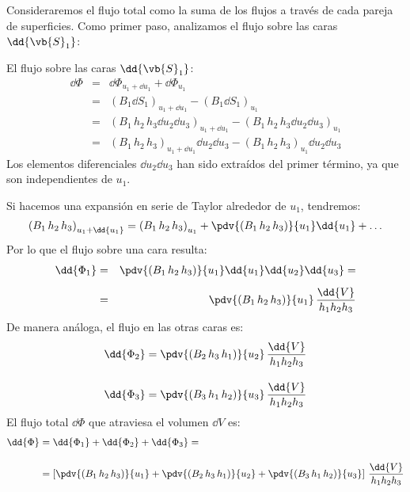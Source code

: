 Consideraremos el flujo total como la suma de los flujos a través de cada pareja de superficies. Como primer paso, analizamos el flujo sobre las caras $\dd{\vb{S}_{1}}$:
\par
El flujo sobre las caras $\dd{\vb{S}_{1}}$:
\begin{eqnarray*}
\dd{\Phi} &=& \dd{\Phi_{u_{1} + \dd{u_{1}}}} + \dd{\Phi_{u_{1}}} \\[0.5em] 
&=& \left( B_{1} \dd{S_{1}} \right)_{u_{1} + \dd{u_{1}}} - \left( B_{1} \dd{S_{1}} \right)_{u_{1}} \\[0.5em] 
&=& \left( B_{1} \, h_{2} \, h_{3} \dd{u_{2}} \dd{u_{3}} \right)_{u_{1} + \dd{u_{1}}} - \left( B_{1} \, h_{2} \, h_{3} \dd{u_{2}} \dd{u_{3}} \right)_{u_{1}} \\[0.5em] 
&=& \left( B_{1} \, h_{2} \, h_{3} \right)_{u_{1} + \dd{u_{1}}} \dd{u_{2}} \dd{u_{3}} - \left( B_{1} \, h_{2} \, h_{3} \right)_{u_{1}} \dd{u_{2}} \dd{u_{3}}
\end{eqnarray*}
Los elementos diferenciales $\dd{u_{2}} \dd{u_{3}}$ han sido extraídos del primer término, ya que son independientes de $u_{1}$.
\par
Si hacemos una expansión en serie de Taylor alrededor de $u_{1}$, tendremos:
\fontsize{12}{12}\selectfont
\begin{align*}
\left( B_{1} \, h_{2} \, h_{3} \right)_{u_{1} + \dd{u_{1}}} = \left( B_{1} \, h_{2} \, h_{3} \right)_{u_{1}} + \pdv{\left( B_{1} \, h_{2} \, h_{3} \right)}{u_{1}} \dd{u_{1}} + \ldots
\end{align*}
Por lo que el flujo sobre una cara resulta:
\begin{eqnarray*}
\dd{\Phi_{1}} &=& \pdv{\left( B_{1} \, h_{2} \, h_{3} \right)}{u_{1}} \dd{u_{1}} \dd{u_{2}} \dd{u_{3}} = \\[0.5em] 
&=& \pdv{\left( B_{1} \, h_{2} \, h_{3} \right)}{u_{1}} \, \dfrac{\dd{V}}{h_{1} h_{2} h_{3}}
\end{eqnarray*}
De manera análoga, el flujo en las otras caras es:
\begin{align*}
\dd{\Phi_{2}} &= \pdv{\left( B_{2} \, h_{3} \, h_{1} \right)}{u_{2}} \, \dfrac{\dd{V}}{h_{1} h_{2} h_{3}} \\[1em]
\dd{\Phi_{3}} &= \pdv{\left( B_{3} \, h_{1} \, h_{2} \right)}{u_{3}} \, \dfrac{\dd{V}}{h_{1} h_{2} h_{3}}
\end{align*}
El flujo total $\dd{\Phi}$ que atraviesa el volumen $\dd{V}$ es:
\fontsize{12}{12}\selectfont
\begin{align*}
\dd{\Phi} &= \dd{\Phi_{1}} + \dd{\Phi_{2}} + \dd{\Phi_{3}} = \\[1em]
&= \left[ \pdv{\left( B_{1} \, h_{2} \, h_{3} \right)}{u_{1}} + \pdv{\left( B_{2} \, h_{3} \, h_{1} \right)}{u_{2}} + \pdv{\left( B_{3} \, h_{1} \, h_{2} \right)}{u_{3}} \right] \, \dfrac{\dd{V}}{h_{1} h_{2} h_{3}}
\end{align*}

